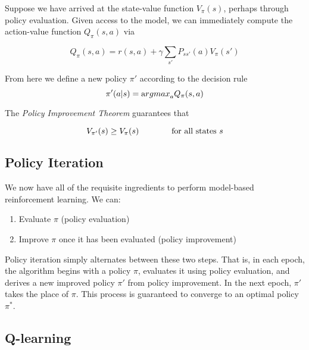 Suppose we have arrived at the state-value function $V_{\pi}(s)$, perhaps through policy evaluation. Given access to the model, we can immediately compute the action-value function $Q_{\pi}(s,a)$ via

\begin{equation}
    Q_{\pi}(s,a) = r(s,a) + \gamma \sum_{s'} P_{ss'}(a) V_{\pi}(s')
    \label{qfromv}
\end{equation}

From here we define a new policy $\pi'$ according to the decision rule
\begin{equation}
    \pi'(a | s) = {\text argmax}_a Q_{\pi} (s, a)
    \label{policyimprovement}
\end{equation}

The {\em Policy Improvement Theorem} guarantees that

\begin{equation}
    V_{\pi'}(s) \geq V_{\pi}(s) \text{\hspace{.5in} for all states $s$} 
    \label{policyimprovementtheorem}
\end{equation}


\subsection{Policy Iteration}

We now have all of the requisite ingredients to perform model-based reinforcement learning. We can:
\begin{enumerate}
    \item Evaluate $\pi$ (policy evaluation)
    \item Improve $\pi$ once it has been evaluated (policy improvement)
\end{enumerate}

Policy iteration simply alternates between these two steps. That is, in each epoch, the algorithm begins with a policy $\pi$, evaluates it using policy evaluation, and derives a new improved policy $\pi'$ from policy improvement. In the next epoch, $\pi'$ takes the place of $\pi$. This process is guaranteed to converge to an optimal policy $\pi^*$. 

\subsection{Q-learning}

